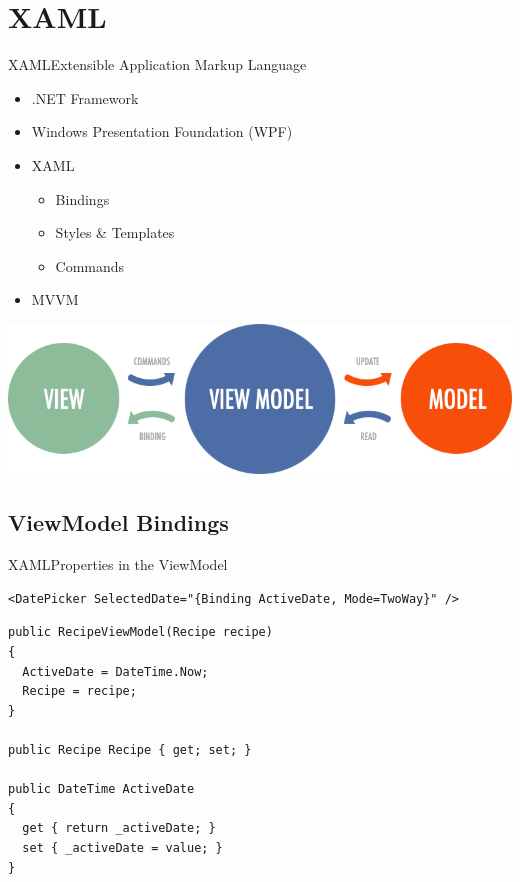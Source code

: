 \section{XAML} 
\begin{frame}[fragile]{XAML}{Extensible Application Markup Language}
  \begin{itemize}
    \item .NET Framework
    \item Windows Presentation Foundation (WPF)
    \item XAML
    \begin{itemize}
      \item Bindings
      \item Styles \& Templates
      \item Commands
    \end{itemize}
    \item MVVM
  \end{itemize}


  \includegraphics[width=\textwidth]{slides/mvvm.png}

\end{frame}


\subsection{ViewModel Bindings} 
\begin{frame}[fragile]{XAML}{Properties in the ViewModel}

\begin{lstlisting}
<DatePicker SelectedDate="{Binding ActiveDate, Mode=TwoWay}" />
\end{lstlisting}

\begin{lstlisting}
public RecipeViewModel(Recipe recipe)
{
  ActiveDate = DateTime.Now;
  Recipe = recipe;
}

public Recipe Recipe { get; set; }

public DateTime ActiveDate
{
  get { return _activeDate; }
  set { _activeDate = value; }
}
\end{lstlisting}

\end{frame}

